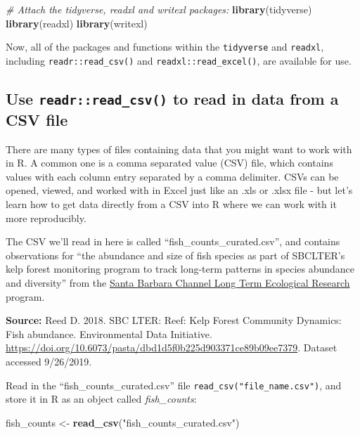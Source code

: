 \documentclass[]{book}
\newenvironment{Shaded}{\begin{snugshade}}{\end{snugshade}}
\newcommand{\CommentTok}[1]{\textcolor[rgb]{0.56,0.35,0.01}{\textit{#1}}}
\newcommand{\KeywordTok}[1]{\textcolor[rgb]{0.13,0.29,0.53}{\textbf{#1}}}
\newcommand{\NormalTok}[1]{#1}
\newcommand{\StringTok}[1]{\textcolor[rgb]{0.31,0.60,0.02}{#1}}
\begin{document}
\begin{Shaded}
\begin{Highlighting}[]
\CommentTok{# Attach the tidyverse, readxl and writexl packages:}
\KeywordTok{library}\NormalTok{(tidyverse)}
\KeywordTok{library}\NormalTok{(readxl)}
\KeywordTok{library}\NormalTok{(writexl)}
\end{Highlighting}
\end{Shaded}

Now, all of the packages and functions within the \texttt{tidyverse} and \texttt{readxl}, including \texttt{readr::read\_csv()} and \texttt{readxl::read\_excel()}, are available for use.

\hypertarget{use-readrread_csv-to-read-in-data-from-a-csv-file}{%
\subsection{\texorpdfstring{Use \texttt{readr::read\_csv()} to read in data from a CSV file}{Use readr::read\_csv() to read in data from a CSV file}}\label{use-readrread_csv-to-read-in-data-from-a-csv-file}}

There are many types of files containing data that you might want to work with in R. A common one is a comma separated value (CSV) file, which contains values with each column entry separated by a comma delimiter. CSVs can be opened, viewed, and worked with in Excel just like an .xls or .xlsx file - but let's learn how to get data directly from a CSV into R where we can work with it more reproducibly.

The CSV we'll read in here is called ``fish\_counts\_curated.csv'', and contains observations for ``the abundance and size of fish species as part of SBCLTER's kelp forest monitoring program to track long-term patterns in species abundance and diversity'' from the \href{http://sbc.lternet.edu/}{Santa Barbara Channel Long Term Ecological Research} program.

\textbf{Source:} Reed D. 2018. SBC LTER: Reef: Kelp Forest Community Dynamics: Fish abundance. Environmental Data Initiative. \url{https://doi.org/10.6073/pasta/dbd1d5f0b225d903371ce89b09ee7379}. Dataset accessed 9/26/2019.

Read in the ``fish\_counts\_curated.csv'' file \texttt{read\_csv("file\_name.csv")}, and store it in R as an object called \emph{fish\_counts}:

\begin{Shaded}
\begin{Highlighting}[]
\NormalTok{fish_counts <-}\StringTok{ }\KeywordTok{read_csv}\NormalTok{(}\StringTok{"fish_counts_curated.csv"}\NormalTok{)}
\end{Highlighting}
\end{Shaded}
\end{document}
